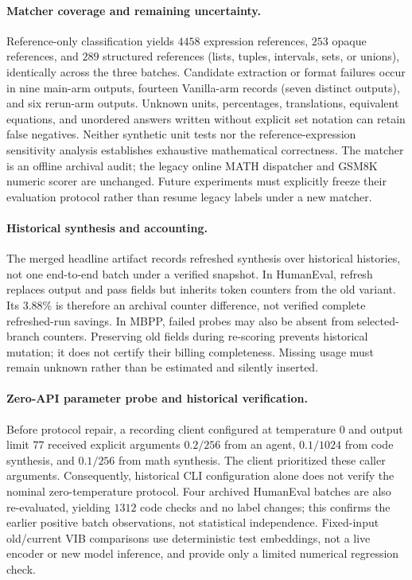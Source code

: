 \documentclass[11pt,twoside,twocolumn,letterpaper]{article}
\begin{document}
\paragraph{Matcher coverage and remaining uncertainty.} Reference-only classification yields $4458$ expression references, $253$ opaque references, and $289$ structured references (lists, tuples, intervals, sets, or unions), identically across the three batches. Candidate extraction or format failures occur in nine main-arm outputs, fourteen Vanilla-arm records (seven distinct outputs), and six rerun-arm outputs. Unknown units, percentages, translations, equivalent equations, and unordered answers written without explicit set notation can retain false negatives. Neither synthetic unit tests nor the reference-expression sensitivity analysis establishes exhaustive mathematical correctness. The matcher is an offline archival audit; the legacy online MATH dispatcher and GSM8K numeric scorer are unchanged. Future experiments must explicitly freeze their evaluation protocol rather than resume legacy labels under a new matcher.

\paragraph{Historical synthesis and accounting.} The merged headline artifact records refreshed synthesis over historical histories, not one end-to-end batch under a verified snapshot. In HumanEval, refresh replaces output and pass fields but inherits token counters from the old variant. Its $3.88\%$ is therefore an archival counter difference, not verified complete refreshed-run savings. In MBPP, failed probes may also be absent from selected-branch counters. Preserving old fields during re-scoring prevents historical mutation; it does not certify their billing completeness. Missing usage must remain unknown rather than be estimated and silently inserted.

\paragraph{Zero-API parameter probe and historical verification.} Before protocol repair, a recording client configured at temperature $0$ and output limit $77$ received explicit arguments $0.2/256$ from an agent, $0.1/1024$ from code synthesis, and $0.1/256$ from math synthesis. The client prioritized these caller arguments. Consequently, historical CLI configuration alone does not verify the nominal zero-temperature protocol. Four archived HumanEval batches are also re-evaluated, yielding $1312$ code checks and no label changes; this confirms the earlier positive batch observations, not statistical independence. Fixed-input old/current VIB comparisons use deterministic test embeddings, not a live encoder or new model inference, and provide only a limited numerical regression check.
\end{document}
